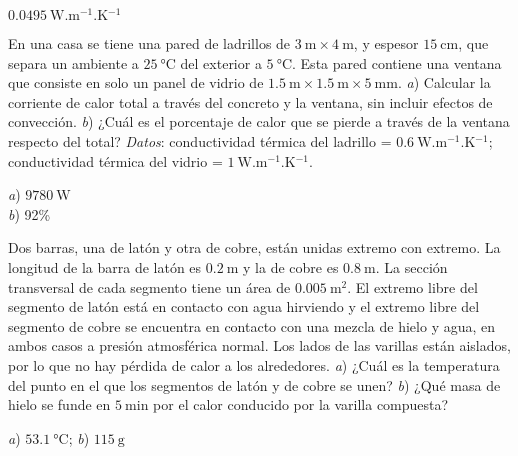 \begin{Answer}
  $\SI{0.0495}{\watt.\metre^{-1}.\kelvin^{-1}}$
\end{Answer}
%
\begin{Exercise}\label{p:transmision00}
  En una casa se tiene una pared de ladrillos de $\SI{3}{\metre} \times \SI{4}{\metre}$, y espesor $\SI{15}{\centi\metre}$, que separa un ambiente a $\SI{25}{\celsius}$ del exterior a $\SI{5}{\celsius}$. Esta pared contiene una ventana que consiste en solo un panel de vidrio de $\SI{1.5}{\metre} \times \SI{1.5}{\metre} \times \SI{5}{\milli\metre}$. \textit{a}) Calcular la corriente de calor total a través del concreto y la ventana, sin incluir efectos de convección. \textit{b}) ¿Cuál es el porcentaje de calor que se pierde a través de la ventana respecto del total? \textit{Datos}: conductividad térmica del ladrillo = $\SI{0.6}{\watt.\metre^{-1}.\kelvin^{-1}}$; conductividad térmica del vidrio = $\SI{1}{\watt.\metre^{-1}.\kelvin^{-1}}$.
\end{Exercise}
\begin{Answer}
	\begin{minipage}[t]{.4\textwidth}
    \textit{a}) $\SI{9780}{\watt}$\\ \textit{b}) 92\%
  \end{minipage}
\end{Answer}
%
\begin{Exercise}
  Dos barras, una de latón y otra de cobre, están unidas extremo con extremo. La longitud de la barra de latón es $\SI{0.2}{\metre}$ y la de cobre es $\SI{0.8}{\metre}$. La sección transversal de cada segmento tiene un área de $\SI{0.005}{\square\metre}$. El extremo libre del segmento de latón está en contacto con agua hirviendo y el extremo libre del segmento de cobre se encuentra en contacto con una mezcla de hielo y agua, en ambos casos a presión atmosférica normal. Los lados de las varillas están aislados, por lo que no hay pérdida de calor a los alrededores. \textit{a}) ¿Cuál es la temperatura del punto en el que los segmentos de latón y de cobre se unen? \textit{b}) ¿Qué masa de hielo se funde en $\SI{5}{\minute}$ por el calor conducido por la varilla compuesta?
\end{Exercise}
\begin{Answer}
	\begin{minipage}[t]{.4\textwidth}
    \textit{a}) $\SI{53.1}{\celsius}$; \textit{b}) $\SI{115}{\gram}$
  \end{minipage}
\end{Answer}
